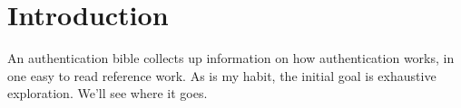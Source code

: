 \section{Introduction}

An authentication bible collects up information on how authentication works,
in one easy to read reference work. As is my habit, the initial goal is
exhaustive exploration. We'll see where it goes.
